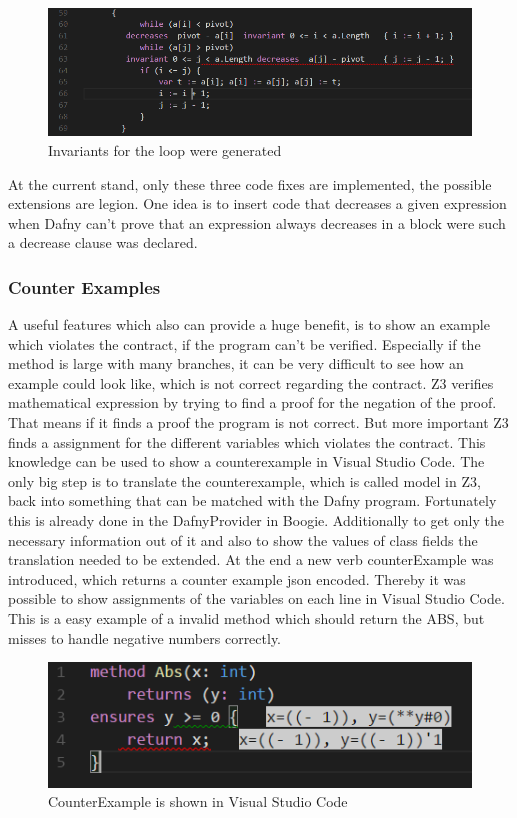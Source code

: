   \begin{figure}[H]
	\centering
	\includegraphics[width=1\textwidth]{img/indexChecked}
	\caption{Invariants for the loop were generated}
	\label{fig:indexInBound}
\end{figure}
At the current stand, only these three code fixes are implemented, the possible extensions are legion. One idea is to insert code that decreases a given expression when Dafny can't prove that an expression always decreases in a block were such a decrease clause was declared.\newline


\subsubsection{Counter Examples}
A useful features which also can provide a huge benefit, is to show an example which violates the contract, if the program can't be verified. Especially if the method is large with many branches, it can be very difficult to see how an example could look like, which is not correct regarding the contract. \newline
Z3 verifies mathematical expression by trying to find a proof for the negation of the proof. That means if it finds a proof the program is not correct. But more important Z3 finds a assignment for the different variables which violates the contract. This knowledge can be used to show a counterexample in Visual Studio Code. The only big step is to translate the counterexample, which is called model in Z3, back into something that can be matched with the Dafny program. Fortunately this is already done in the DafnyProvider in Boogie. Additionally to get only the necessary information out of it and also to show the values of class fields the translation needed to be extended. At the end a new verb counterExample was introduced, which returns a counter example json encoded. Thereby it was possible to show assignments of the variables on each line in Visual Studio Code. \newline
This is a easy example of a invalid method which should return the ABS, but misses to handle negative numbers correctly. 
\begin{figure}[H]
	\centering
	\includegraphics[width=1\textwidth]{img/counterModel}
	\caption{CounterExample is shown in Visual Studio Code}
	\label{fig:counterModel}
\end{figure}

